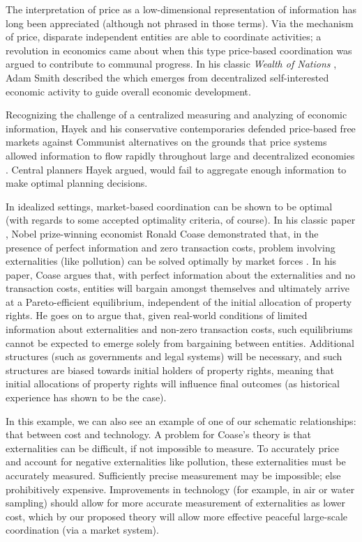 \bigskip

The interpretation of price as a low-dimensional representation of information has long been appreciated (although not phrased in those terms).
Via the mechanism of price, disparate independent entities are able to coordinate activities; a revolution in economics came about when this type price-based coordination was argued to contribute to communal progress.
In his classic \textit{Wealth of Nations} \cite{smith}, Adam Smith described the  which emerges from decentralized self-interested economic activity to guide overall economic development.

Recognizing the challenge of a centralized measuring and analyzing of economic information, Hayek and his conservative contemporaries defended price-based free markets against Communist alternatives on the grounds that price systems allowed information to flow rapidly throughout large and decentralized economies \cite{hayek}.
Central planners Hayek argued, would fail to aggregate enough information to make optimal planning decisions.

\bigskip

In idealized settings, market-based coordination can be shown to be optimal (with regards to some accepted optimality criteria, of course).
In his classic paper , Nobel prize-winning economist Ronald Coase demonstrated that, in the presence of perfect information and zero transaction costs, problem involving externalities (like pollution) can be solved optimally by market forces \cite{coase}.
In his paper, Coase argues that, with perfect information about the externalities and no transaction costs, entities will bargain amongst themselves and ultimately arrive at a Pareto-efficient equilibrium, independent of the initial allocation of property rights.
He goes on to argue that, given real-world conditions of limited information about externalities and non-zero transaction costs, such equilibriums cannot be expected to emerge solely from bargaining between entities.
Additional structures (such as governments and legal systems) will be necessary, and such structures are biased towards initial holders of property rights, meaning that initial allocations of property rights will influence final outcomes (as historical experience has shown to be the case).
 
In this example, we can also see an example of one of our schematic relationships: that between cost and technology.
A problem for Coase's theory is that externalities can be difficult, if not impossible to measure.
To accurately price and account for negative externalities like pollution, these externalities must be accurately measured.
Sufficiently precise measurement may be impossible; else prohibitively expensive.
Improvements in technology (for example, in air or water sampling) should allow for more accurate measurement of externalities as lower cost, which by our proposed theory will allow more effective peaceful large-scale coordination (via a market system).

